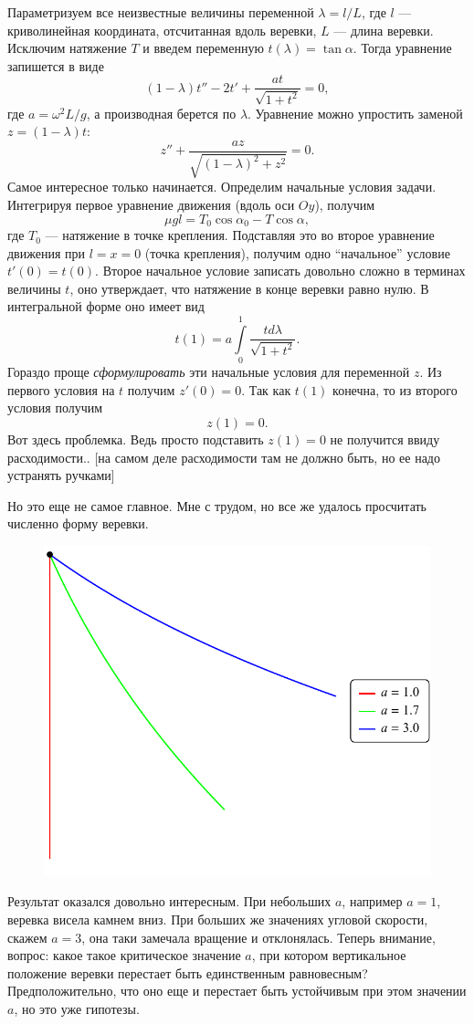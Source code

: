 \documentclass[12pt,a4paper]{article}
\begin{document}
Параметризуем все неизвестные величины переменной $\lambda=l/L$, где $l$ --- криволинейная координата, отсчитанная вдоль веревки, $L$ --- длина веревки. Исключим натяжение $T$ и введем переменную $t(\lambda)=\tan\alpha$. Тогда уравнение запишется в виде
$$
  (1-\lambda)t''-2t'+\frac{at}{\sqrt{1+t^2}}=0,
$$
где $a=\omega^2 L/g$, а производная берется по $\lambda$. Уравнение можно упростить заменой $z=(1-\lambda)t$:
$$
  z''+\frac{az}{\sqrt{(1-\lambda)^2+z^2}}=0.
$$
Самое интересное только начинается. Определим начальные условия задачи. Интегрируя первое уравнение движения (вдоль оси $Oy$), получим
$$
  \mu gl=T_0 \cos\alpha_0-T\cos\alpha,
$$
где $T_0$ --- натяжение в точке крепления. Подставляя это во второе уравнение движения при $l=x=0$ (точка крепления), получим одно ``начальное'' условие $t'(0)=t(0)$. Второе начальное условие записать довольно сложно в терминах величины $t$, оно утверждает, что натяжение в конце веревки равно нулю. В интегральной форме оно имеет вид
$$
  t(1)=a\int\limits_0^1 \frac{td\lambda}{\sqrt{1+t^2}}.  
$$
Гораздо проще \textit{сформулировать} эти начальные условия для переменной $z$. Из первого условия на $t$ получим $z'(0)=0$. Так как $t(1)$ конечна, то из второго условия получим
$$
  z(1)=0.
$$
Вот здесь проблемка. Ведь просто подставить $z(1)=0$ не получится ввиду расходимости.. [на самом деле расходимости там не должно быть, но ее надо устранять ручками]

Но это еще не самое главное. Мне с трудом, но все же удалось просчитать численно форму веревки.
\begin{figure}[!h]
\begin{center}
\includegraphics[scale=1]{ropeshape.pdf}
\end{center}
\end{figure}

Результат оказался довольно интересным. При небольших $a$, например $a=1$, веревка висела камнем вниз. При больших же значениях угловой скорости, скажем $a=3$, она таки замечала вращение и отклонялась. Теперь внимание, вопрос: какое такое критическое значение $a$, при котором вертикальное положение веревки перестает быть единственным равновесным? Предположительно, что оно еще и перестает быть устойчивым при этом значении $a$, но это уже гипотезы.
\end{document}
